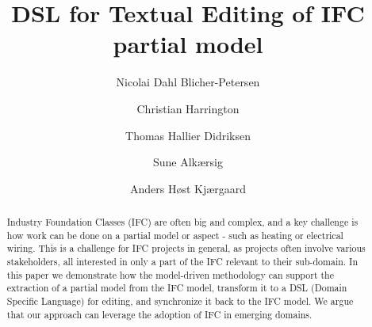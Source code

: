 \documentclass[oribibl]{llncs}
\begin{document}

\mainmatter              %
\title{DSL for Textual Editing of IFC partial model}

\author{Nicolai Dahl Blicher-Petersen \and Christian Harrington \and
Thomas Hallier Didriksen \and Sune Alkærsig \and Anders Høst Kjærgaard\\
}



\maketitle              %

\begin{abstract}
Industry Foundation Classes (IFC) are often big and complex, and a key challenge is how work can be done on a partial model or aspect - such as heating or electrical wiring. This is a challenge for IFC projects in general, as projects often involve various stakeholders, all interested in only a part of the IFC relevant to their sub-domain. In this paper we demonstrate how the model-driven methodology can support the extraction of a partial model from the IFC model, transform it to a DSL (Domain Specific Language) for editing, and synchronize it back to the IFC model. We argue that our approach can leverage the adoption of IFC in emerging domains.


\end{abstract}










\end{document}
